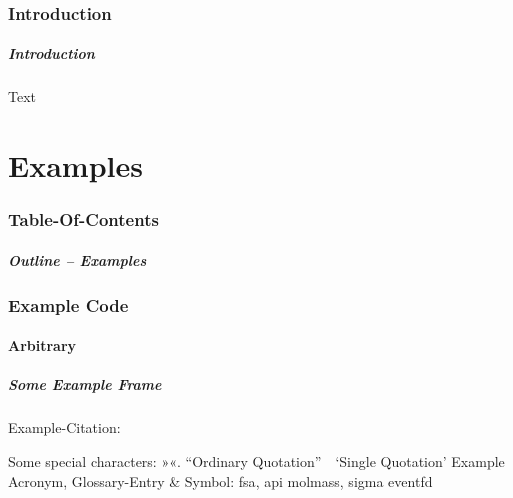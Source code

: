 \section{Introduction}
\label{sec:intro}


\begin{frame}
\frametitle{Introduction}
Text
\end{frame}







\part{Examples}

\section*{Table-Of-Contents}%
\begin{frame}%
\frametitle{Outline -- Examples}%
\tableofcontents%
\end{frame}%

\section{Example Code}

\subsection{Arbitrary}

\begin{frame}
	\frametitle{Some Example Frame}
	Example-Citation:
	\cite{DenKr_denkrement1_indeco}

	\npi%
	Some special characters:
	»«.
	\nl%
	\nl
	\enquote{Ordinary Quotation}\ \ \enquote*{Single Quotation}
	\nl%
	Example Acronym, Glossary-Entry \& Symbol:\nl
	\gls{fsa}, \gls{api}\nl
	\gls{molmass}, \gls{sigma}\nl
	\gls{eventfd}
\end{frame}




